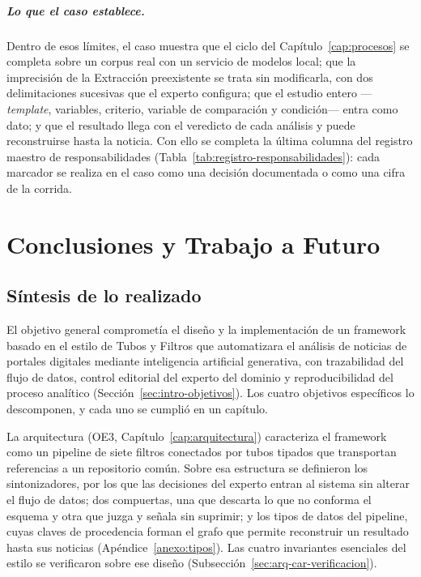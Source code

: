 \documentclass[12pt]{report}
\begin{document}
\paragraph{Lo que el caso establece.} Dentro de esos límites, el caso muestra que el ciclo del Capítulo~\ref{cap:procesos} se completa sobre un corpus real con un servicio de modelos local; que la imprecisión de la Extracción preexistente se trata sin modificarla, con dos delimitaciones sucesivas que el experto configura; que el estudio entero ---\textit{template}, variables, criterio, variable de comparación y condición--- entra como dato; y que el resultado llega con el veredicto de cada análisis y puede reconstruirse hasta la noticia. Con ello se completa la última columna del registro maestro de responsabilidades (Tabla~\ref{tab:registro-responsabilidades}): cada marcador se realiza en el caso como una decisión documentada o como una cifra de la corrida.

\chapter{Conclusiones y Trabajo a Futuro}
\label{cap:conclusiones}

\section{Síntesis de lo realizado}
\label{sec:conc-sintesis}

El objetivo general comprometía el diseño y la implementación de un framework basado en el estilo de Tubos y Filtros que automatizara el análisis de noticias de portales digitales mediante inteligencia artificial generativa, con trazabilidad del flujo de datos, control editorial del experto del dominio y reproducibilidad del proceso analítico (Sección~\ref{sec:intro-objetivos}). Los cuatro objetivos específicos lo descomponen, y cada uno se cumplió en un capítulo.

La arquitectura (OE3, Capítulo~\ref{cap:arquitectura}) caracteriza el framework como un pipeline de siete filtros conectados por tubos tipados que transportan referencias a un repositorio común. Sobre esa estructura se definieron los sintonizadores, por los que las decisiones del experto entran al sistema sin alterar el flujo de datos; dos compuertas, una que descarta lo que no conforma el esquema y otra que juzga y señala sin suprimir; y los tipos de datos del pipeline, cuyas claves de procedencia forman el grafo que permite reconstruir un resultado hasta sus noticias (Apéndice~\ref{anexo:tipos}). Las cuatro invariantes esenciales del estilo se verificaron sobre ese diseño (Subsección~\ref{sec:arq-car-verificacion}).
\end{document}
